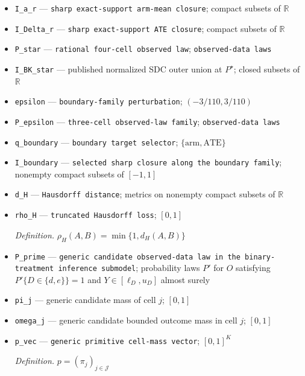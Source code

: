 \documentclass{article}
\begin{document}
\begin{itemize}
  \item \texttt{I\_\allowbreak{}a\_\allowbreak{}r} --- \texttt{sharp exact-\allowbreak{}support arm-\allowbreak{}mean closure}; compact subsets of \(\mathbb R\)
  \item \texttt{I\_\allowbreak{}Delta\_\allowbreak{}r} --- \texttt{sharp exact-\allowbreak{}support ATE closure}; compact subsets of \(\mathbb R\)
  \item \texttt{P\_\allowbreak{}star} --- \texttt{rational four-\allowbreak{}cell observed law}; \texttt{observed-\allowbreak{}data laws}
  \item \texttt{I\_\allowbreak{}BK\_\allowbreak{}star} --- published normalized SDC outer union at \(P^\star\); closed subsets of \(\mathbb R\)
  \item \texttt{epsilon} --- \texttt{boundary-\allowbreak{}family perturbation}; \((-3/110,3/110)\)
  \item \texttt{P\_\allowbreak{}epsilon} --- \texttt{three-\allowbreak{}cell observed-\allowbreak{}law family}; \texttt{observed-\allowbreak{}data laws}
  \item \texttt{q\_\allowbreak{}boundary} --- \texttt{boundary target selector}; \(\{\mathrm{arm},\mathrm{ATE}\}\)
  \item \texttt{I\_\allowbreak{}boundary} --- \texttt{selected sharp closure along the boundary family}; nonempty compact subsets of \([-1,1]\)
  \item \texttt{d\_\allowbreak{}H} --- \texttt{Hausdorff distance}; metrics on nonempty compact subsets of \(\mathbb R\)
  \item \texttt{rho\_\allowbreak{}H} --- \texttt{truncated Hausdorff loss}; \([0,1]\)
  \par\smallskip\noindent\emph{Definition.} \(\rho_H(A,B)=\min\{1,d_H(A,B)\}\)
  \item \texttt{P\_\allowbreak{}prime} --- \texttt{generic candidate observed-\allowbreak{}data law in the binary-\allowbreak{}treatment inference submodel}; probability laws \(P'\) for \(O\) satisfying \(P'\{D\in\{d,e\}\}=1\) and \(Y\in[\ell_D,u_D]\) almost surely
  \item \texttt{pi\_\allowbreak{}j} --- generic candidate mass of cell \(j\); \([0,1]\)
  \item \texttt{omega\_\allowbreak{}j} --- generic candidate bounded outcome mass in cell \(j\); \([0,1]\)
  \item \texttt{p\_\allowbreak{}vec} --- \texttt{generic primitive cell-\allowbreak{}mass vector}; \([0,1]^K\)
  \par\smallskip\noindent\emph{Definition.} \(p=(\pi_j)_{j\in\mathcal J}\)

\end{itemize}
\end{document}
